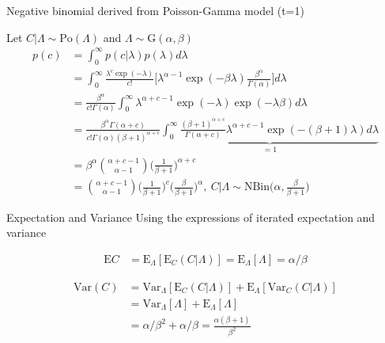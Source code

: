 \documentclass[english]{beamer}\usepackage[]{graphicx}\usepackage[]{xcolor}
\begin{document}
\begin{frame}[shrink = 5]{Negative binomial derived from Poisson-Gamma model (t=1)}

Let $C|\Lambda \sim \textrm{Po}(\Lambda)$ and $\Lambda \sim \textrm{G}(\alpha,\beta)$
\begin{align*}
p(c)&=\int^\infty_0 p(c|\lambda) p(\lambda) d\lambda\\
&=\int^\infty_0 \frac{\lambda^c\exp(-\lambda)}{c!}\Bigg[\lambda^{\alpha-1}\exp(-\beta\lambda)\frac{\beta^\alpha}{\Gamma(\alpha)}\Bigg]d\lambda\\
&=\frac{\beta^\alpha}{c!\Gamma(\alpha)}\int^\infty_0 \lambda^{\alpha+c-1}\exp(-\lambda)\exp(-\lambda\beta)d\lambda\\
&=\frac{\beta^\alpha\Gamma(\alpha+c)}{c!\Gamma(\alpha) (\beta+1)^{\alpha+c}}\underbrace{\int^\infty_0 \frac{(\beta+1)^{\alpha+c}}{\Gamma(\alpha+c)} \lambda^{\alpha+c-1}\exp(-(\beta+1)\lambda)d\lambda}_{=1}\\
&=\beta^\alpha\binom{\alpha+c-1}{\alpha-1}\Bigg (\frac{1}{\beta+1}\Bigg)^{\alpha+c}\\
&=\binom{\alpha+c-1}{\alpha-1}\Bigg (\frac{1}{\beta+1}\Bigg)^{c} \Bigg(\frac{\beta}{\beta+1}\Bigg)^{\alpha}, \ C|\Lambda\sim \textrm{NBin} \Bigg(\alpha, \frac{\beta}{\beta+1}\Bigg)
\end{align*}
\end{frame}


\begin{frame}{Expectation and Variance}
Using the expressions of iterated expectation and variance \citep{held2014applied}

\begin{align*}
\textrm{E}C &= \textrm{E}_{\Lambda}[\textrm{E}_{C} (C|\Lambda)] = \textrm{E}_{\Lambda}[\Lambda] = \alpha/\beta
\end{align*}

\begin{align*}
\textrm{Var}(C) &= \textrm{Var}_{\Lambda}[\textrm{E}_{C} (C|\Lambda)] + \textrm{E}_{\Lambda}[\textrm{Var}_C(C|\Lambda)]\\
&=\textrm{Var}_{\Lambda}[\Lambda] + \textrm{E}_{\Lambda}[\Lambda] \\
&=\alpha/\beta^2 + \alpha/\beta = \frac{\alpha(\beta+1)}{\beta^2}
\end{align*}
\end{frame}
\end{document}
